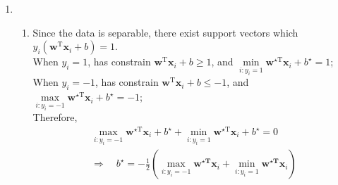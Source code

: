 \documentclass[a4paper]{article}
\begin{document}
\begin{enumerate}
\item 
\begin{enumerate}
  \item Since the data is separable, there exist support vectors which $y_{i}\left(\boldsymbol{w}^{\mathrm{T}} \boldsymbol{x}_{i}+b\right) = 1$.\\
  When $y_{i}=1$, has constrain $\boldsymbol{w}^{\mathrm{T}} \boldsymbol{x}_{i}+b \geq 1$, and $\underset{i: y_{i}=1}\min \boldsymbol{w}^{\star \mathrm{T}} \boldsymbol{x}_{i}+b^{\star}=1$;\\
  When $y_{i}=-1$, has constrain $\boldsymbol{w}^{\mathrm{T}} \boldsymbol{x}_{i}+b \leq -1$, and $\underset{i: y_{i}=-1}\max \boldsymbol{w}^{\star \mathrm{T}} \boldsymbol{x}_{i}+b^{\star}=-1$;\\
  Therefore,
  \begin{equation*}
    \begin{aligned}
      \underset{i: y_{i}=-1}\max \boldsymbol{w}^{\star \mathrm{T}} \boldsymbol{x}_{i}+b^{\star} + \underset{i: y_{i}=1}\min \boldsymbol{w}^{\star \mathrm{T}} \boldsymbol{x}_{i}+b^{\star}=0\\
      \Rightarrow \quad b^{\star}=-\frac{1}{2}\left(\max _{i: y_{i}=-1} \boldsymbol{w}^{\star \mathbf{T}} \boldsymbol{x}_{i}+\min _{i: y_{i}=1} \boldsymbol{w}^{\star \mathbf{T}} \boldsymbol{x}_{i}\right)
    \end{aligned}
  \end{equation*}
  
  
  

\end{enumerate}
\end{enumerate}
\end{document}
